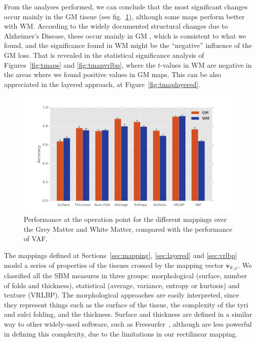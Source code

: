 From the analyses performed, we can conclude that the most significant changes occur mainly in the \ac{GM} tissue (see fig.~\ref{fig:performance}), although some maps perform better with \ac{WM}. According to the widely documented structural changes due to Alzheimer's Disease, these occur mainly in \ac{GM} \cite{Misra2009,Baron2001,Pievani2013,Stoeckel04,han2006reliability,Fischl2004}, which is consistent to what we found, and the significance found in \ac{WM} might be the ``negative'' influence of the \ac{GM} loss. That is revealed in the statistical significance analysis of Figures~\ref{fig:tmaps} and \ref{fig:tmapvrlbp}, where the $t$-values in \ac{WM} are negative in the areas where we found positive values in \ac{GM} maps. This can be also appreciated in the layered approach, at Figure~\ref{fig:tmaplayered}. 

\begin{figure}[htp]
	\centering
	\includegraphics[width=0.8\columnwidth]{Graphics/ch6/12-performance}
	\caption{Performance at the operation point for the different mappings over the Grey Matter and White Matter, compared with the performance of \ac{VAF}.}
	\label{fig:performance}
\end{figure}

The mappings defined at Sections~\ref{sec:mapping}, \ref{sec:layered} and \ref{sec:vrlbp} model a series of properties of the tissues crossed by the mapping vector $\mathbf{v}_{\theta,\varphi}$. We classified all the \ac{SBM} measures in three groups: morphological (surface, number of folds and thickness), statistical (average, variance, entropy or kurtosis) and texture (\ac{VRLBP}). The morphological approaches are easily interpreted, since they represent things such as the surface of the tissue, the complexity of the tyri and sulci folding, and the thickness. Surface and thickness are defined in a similar way to other widely-used software, such as Freesurfer~\cite{Dale1999,Fischl2004}, although are less powerful in defining this complexity, due to the limitations in our rectilinear mapping. 

